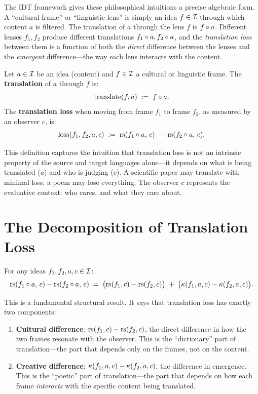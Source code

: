The IDT framework gives these philosophical intuitions a precise algebraic
form.  A ``cultural frame'' or ``linguistic lens'' is simply an idea $f \in \mathcal{I}$
through which content $a$ is filtered.  The translation of $a$ through the
lens $f$ is $f \circ a$.  Different lenses $f_1, f_2$ produce different
translations $f_1 \circ a, f_2 \circ a$, and the \emph{translation loss}
between them is a function of both the \emph{direct} difference between the
lenses and the \emph{emergent} difference---the way each lens interacts with
the content.

\begin{definition}
\label{def:translation}
Let $a \in \mathcal{I}$ be an idea (content) and $f \in \mathcal{I}$ a cultural or linguistic
frame.  The \textbf{translation} of $a$ through $f$ is:
\[
\mathrm{translate}(f, a) \;:=\; f \circ a.
\]
The \textbf{translation loss} when moving from frame $f_1$ to frame $f_2$,
as measured by an observer $c$, is:
\[
\mathrm{loss}(f_1, f_2, a, c) \;:=\;
  \mathrm{rs}(f_1 \circ a,\, c) \;-\; \mathrm{rs}(f_2 \circ a,\, c).
\]
\end{definition}

This definition captures the intuition that translation loss is not an intrinsic
property of the source and target languages alone---it depends on what is being
translated ($a$) and who is judging ($c$).  A scientific paper may translate
with minimal loss; a poem may lose everything.  The observer $c$ represents the
evaluative context: who cares, and what they care about.

\section{The Decomposition of Translation Loss}

\begin{theorem}
\label{thm:translation-loss}
For any ideas $f_1, f_2, a, c \in \mathcal{I}$:
\[
\mathrm{rs}(f_1 \circ a,\, c) - \mathrm{rs}(f_2 \circ a,\, c)
\;=\;
\bigl(\mathrm{rs}(f_1, c) - \mathrm{rs}(f_2, c)\bigr)
\;+\;
\bigl(\kappa(f_1, a, c) - \kappa(f_2, a, c)\bigr).
\]
\end{theorem}

This is a fundamental structural result.  It says that translation loss has
exactly two components:
\begin{enumerate}
\item \textbf{Cultural difference}: $\mathrm{rs}(f_1, c) - \mathrm{rs}(f_2, c)$, the direct
  difference in how the two frames resonate with the observer.  This is the
  ``dictionary'' part of translation---the part that depends only on the frames,
  not on the content.
\item \textbf{Creative difference}: $\kappa(f_1, a, c) - \kappa(f_2, a, c)$,
  the difference in emergence.  This is the ``poetic'' part of
  translation---the part that depends on how each frame \emph{interacts} with
  the specific content being translated.
\end{enumerate}

